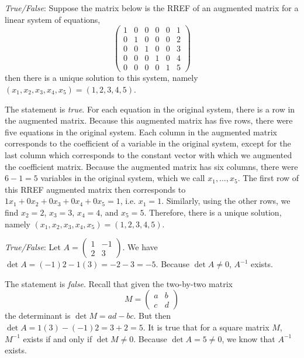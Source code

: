 \documentclass[11pt,letterpaper]{article}
\begin{document}
\quizsol \textit{True/False}: Suppose the matrix below is the RREF of an augmented matrix for a linear system of equations,
	\[
	\begin{pmatrix}
	1 & 0 & 0 & 0 & 0 & 1 \\
	0 & 1 & 0 & 0 & 0 & 2 \\
	0 & 0 & 1 & 0 & 0 & 3 \\
	0 & 0 & 0 & 1 & 0 & 4 \\
	0 & 0 & 0 & 0 & 1 & 5 
	\end{pmatrix}
	\]
then there is a unique solution to this system, namely $(x_1, x_2, x_3, x_4, x_5)= (1, 2, 3, 4, 5)$. \pspace

\sol The statement is \textit{true}. For each equation in the original system, there is a row in the augmented matrix. Because this augmented matrix has five rows, there were five equations in the original system. Each column in the augmented matrix corresponds to the coefficient of a variable in the original system, except for the last column which corresponds to the constant vector with which we augmented the coefficient matrix. Because the augmented matrix has six columns, there were $6 - 1= 5$ variables in the original system, which we call $x_1, \ldots, x_5$. The first row of this RREF augmented matrix then corresponds to $1x_1 + 0x_2 + 0x_3 + 0x_4 + 0x_5= 1$, i.e. $x_1= 1$. Similarly, using the other rows, we find $x_2= 2$, $x_3= 3$, $x_4= 4$, and $x_5= 5$. Therefore, there is a unique solution, namely $(x_1, x_2, x_3, x_4, x_5)= (1, 2, 3, 4, 5)$. \pvspace{1.3cm}



\quizsol \textit{True/False}: Let $A= \begin{pmatrix} 1 & -1 \\ 2 & 3 \end{pmatrix}$. We have $\det A= (-1)2 - 1(3)= -2 - 3= -5$. Because $\det A \neq 0$, $A^{-1}$ exists. \pspace

\sol The statement is \textit{false}. Recall that given the two-by-two matrix
	\[
	M= \begin{pmatrix} a & b \\ c & d \end{pmatrix}
	\]
the determinant is $\det M= ad - bc$. But then $\det A= 1(3) - (-1)2= 3 + 2= 5$. It is true that for a square matrix $M$, $M^{-1}$ exists if and only if $\det M \neq 0$. Because $\det A= 5 \neq 0$, we know that $A^{-1}$ exists. 
\end{document}
